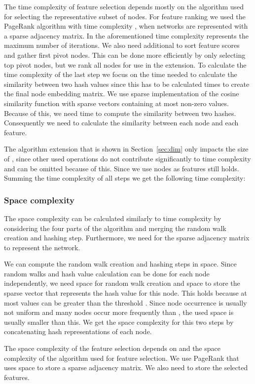 \documentclass[twoside,11pt]{article}
\begin{document}
The time complexity of feature selection depends mostly on the algorithm used for selecting the representative subset of nodes. For feature ranking we used the PageRank algorithm with time complexity , when networks are represented with a sparse adjacency matrix. In the aforementioned time complexity  represents the maximum number of iterations. We also need additional  to sort feature scores and gather first  pivot nodes. This can be done more efficiently by only selecting top  pivot nodes, but we rank all nodes for use in the extension. To calculate the time complexity of the last step we focus on the time needed to calculate the similarity between two hash values since this has to be calculated  times to create the final node embedding matrix. We use sparse implementation of the cosine similarity function with sparse vectors containing at most  non-zero values. Because of this, we need  time to compute the similarity between two hashes. Consequently we need  to calculate the similarity between each node and each feature.

The algorithm extension that is shown in Section~\ref{sec:dim} only impacts the size of , since other used operations do not contribute significantly to time complexity and can be omitted because of this. Since we use nodes as features  still holds.
Summing the time complexity of all steps we get the following time complexity:


\subsubsection{Space complexity}
The space complexity can be calculated similarly to time complexity by considering the four parts of the algorithm and merging the random walk creation and hashing step. Furthermore, we need  for the sparse adjacency matrix to represent the network. 

We can compute the random walk creation and hashing steps in  space. Since random walks and hash value calculation can be done for each node independently, we need  space for random walk creation and  space to store the sparse vector that represents the hash value for this node. This holds because at most  values can be greater than the threshold . Since node occurrence is usually not uniform and many nodes occur more frequently than , the used space is usually smaller than this. We get the space complexity  for this two steps by concatenating hash representations of each node. 

The space complexity of the feature selection depends on  and the space complexity of the algorithm used for feature selection. We use PageRank that uses  space to store a sparse adjacency matrix. We also need  to store the selected features.
\end{document}
